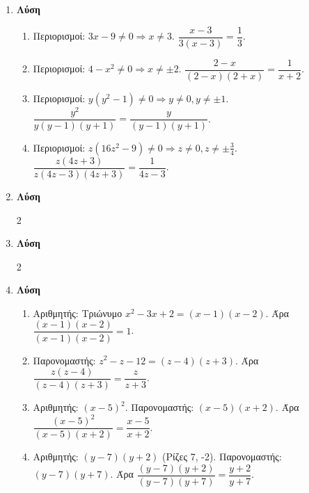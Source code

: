 \documentclass[11pt,a4paper,modern]{FFExercises}
\begin{document}
\begin{enumerate}[resume]
\item \textbf{Λύση}
\begin{enumerate}
\item Περιορισμοί: $3x-9 \neq 0 \Rightarrow x \neq 3$.
$\dfrac{x-3}{3(x-3)} = \dfrac{1}{3}$.
\item Περιορισμοί: $4-x^2 \neq 0 \Rightarrow x \neq \pm 2$.
$\dfrac{2-x}{(2-x)(2+x)} = \dfrac{1}{x+2}$.
\item Περιορισμοί: $y(y^2-1) \neq 0 \Rightarrow y \neq 0, y \neq \pm 1$.
$\dfrac{y^2}{y(y-1)(y+1)} = \dfrac{y}{(y-1)(y+1)}$.
\item Περιορισμοί: $z(16z^2-9) \neq 0 \Rightarrow z \neq 0, z \neq \pm \frac{3}{4}$.
$\dfrac{z(4z+3)}{z(4z-3)(4z+3)} = \dfrac{1}{4z-3}$.
\end{enumerate}

\item \textbf{Λύση}
\begin{multicols}{2}
\end{multicols}

\item \textbf{Λύση}
\begin{multicols}{2}
\end{multicols}

\item \textbf{Λύση}
\begin{enumerate}
\item Αριθμητής: Τριώνυμο $x^2-3x+2 = (x-1)(x-2)$.
Άρα $\dfrac{(x-1)(x-2)}{(x-1)(x-2)} = 1$.
\item Παρονομαστής: $z^2-z-12 = (z-4)(z+3)$.
Άρα $\dfrac{z(z-4)}{(z-4)(z+3)} = \dfrac{z}{z+3}$.
\item Αριθμητής: $(x-5)^2$. Παρονομαστής: $(x-5)(x+2)$.
Άρα $\dfrac{(x-5)^2}{(x-5)(x+2)} = \dfrac{x-5}{x+2}$.
\item Αριθμητής: $(y-7)(y+2)$ (Ρίζες 7, -2). Παρονομαστής: $(y-7)(y+7)$.
Άρα $\dfrac{(y-7)(y+2)}{(y-7)(y+7)} = \dfrac{y+2}{y+7}$.
\end{enumerate}


\end{enumerate}
\end{document}
